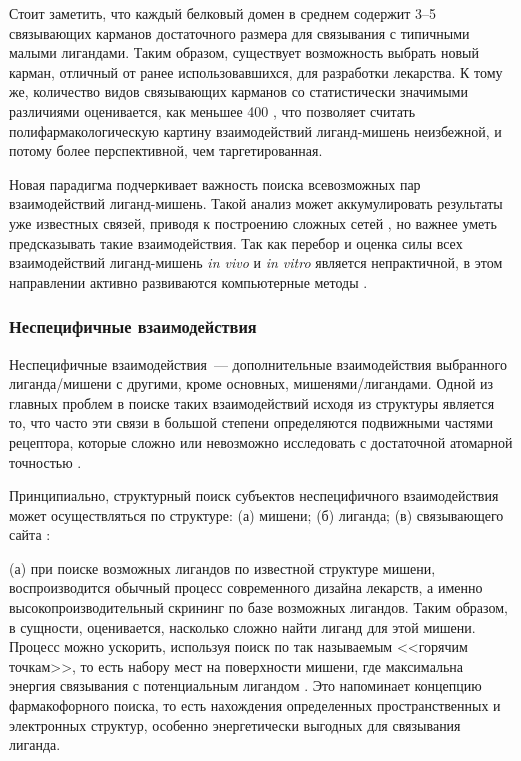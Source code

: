 \documentclass[a4paper,14pt]{article}         %
\begin{document}
Стоит заметить, что каждый белковый домен в среднем содержит 3--5 связывающих карманов достаточного размера для связывания с типичными малыми лигандами\cite{Skolnick2015}. Таким образом, существует возможность выбрать новый карман, отличный от ранее использовавшихся, для разработки лекарства. К тому же, количество видов связывающих карманов со статистически значимыми различиями оценивается, как меньшее 400 \cite{Skolnick2015}, что позволяет считать полифармакологическую картину взаимодействий лиганд-мишень неизбежной, и потому более перспективной, чем таргетированная.

Новая парадигма подчеркивает важность поиска всевозможных пар взаимодействий лиганд-мишень. Такой анализ может аккумулировать результаты уже известных связей, приводя к построению сложных сетей \cite{Anighoro2014}, но важнее уметь предсказывать такие взаимодействия. Так как перебор и оценка силы всех взаимодействий лиганд-мишень \textit{in vivo} и \textit{in vitro} является непрактичной, в этом направлении активно развиваются компьютерные методы \cite{Chaudhari}.

\subsubsection{Неспецифичные взаимодействия}
Неспецифичные взаимодействия~--- дополнительные взаимодействия выбранного лиганда/мишени с другими, кроме основных, мишенями/лигандами. Одной из главных проблем в поиске таких взаимодействий исходя из структуры является то, что часто эти связи в большой степени определяются подвижными частями рецептора, которые сложно или невозможно исследовать с достаточной атомарной точностью \cite{Loving}.

Принципиально, структурный поиск субъектов неспецифичного взаимодействия может осуществляться по структуре: (а) мишени; (б) лиганда; (в) связывающего сайта \cite{Rognan2010}:

(а) при поиске возможных лигандов по известной структуре мишени, воспроизводится обычный процесс современного дизайна лекарств, а именно высокопроизводительный скрининг по базе возможных лигандов. Таким образом, в сущности, оценивается, насколько сложно найти лиганд для этой мишени. Процесс можно ускорить, используя поиск по так называемым <<горячим точкам>>, то есть набору мест на поверхности мишени, где максимальна энергия связывания с потенциальным лигандом \cite{Hall2015}. Это напоминает концепцию фармакофорного поиска, то есть нахождения определенных пространственных и электронных структур, особенно энергетически выгодных для связывания лиганда.
\end{document}
